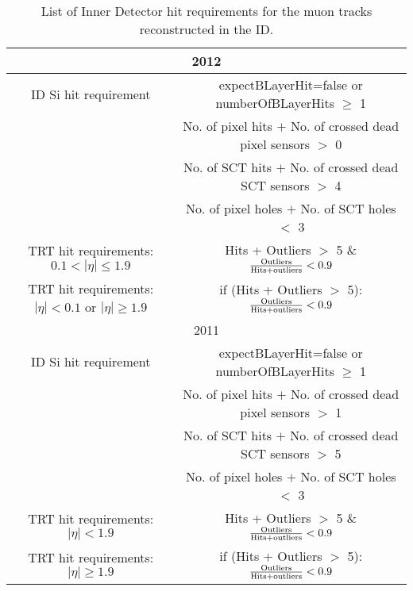 \begin{table}[hbt]
   \centering
   \begin{tabular}{cc}
      \hline
      \hline
      \multicolumn{2}{c}{2012} \\
      \hline
      ID Si hit requirement & expectBLayerHit=false or numberOfBLayerHits $\geq$ 1 \\
                            & No. of pixel hits $+$ No. of crossed dead pixel sensors $ > $ 0 \\
                            & No. of SCT hits $+$ No. of crossed dead SCT sensors $ > $ 4 \\
                            & No. of pixel holes $+$ No. of SCT holes $ < $ 3 \\
      TRT hit requirements: $0.1 < |\eta|\le1.9$& Hits + Outliers $>$ 5 \& $\frac{\rm{Outliers}}{\rm{Hits + outliers}}<0.9 $\\
TRT hit requirements: $|\eta| < 0.1 $ or $|\eta|\geq1.9$ & if (Hits + Outliers $>$ 5):  $\frac{\rm{Outliers}}{\rm{Hits + outliers}} <0.9 $\\
\hline
\hline
      \multicolumn{2}{c}{2011} \\
      \hline
      ID Si hit requirement & expectBLayerHit=false or numberOfBLayerHits $\geq$ 1 \\
                            & No. of pixel hits $+$ No. of crossed dead pixel sensors $ > $ 1 \\
                            & No. of SCT hits $+$ No. of crossed dead SCT sensors $ > $ 5 \\
                            & No. of pixel holes $+$ No. of SCT holes $ < $ 3 \\
      TRT hit requirements: $|\eta|<1.9$& Hits + Outliers $>$ 5 \& $\frac{\rm{Outliers}}{\rm{Hits + outliers}}<0.9 $\\
TRT hit requirements: $|\eta|\geq1.9$ & if (Hits + Outliers $>$ 5):  $\frac{\rm{Outliers}}{\rm{Hits + outliers}} <0.9 $\\
\hline
\hline
  \end{tabular}
   \caption{List of Inner Detector hit requirements for the muon
     tracks reconstructed in the ID.\label{tab:IDhits}}
   \label{tab:muonidhits}
\end{table}


